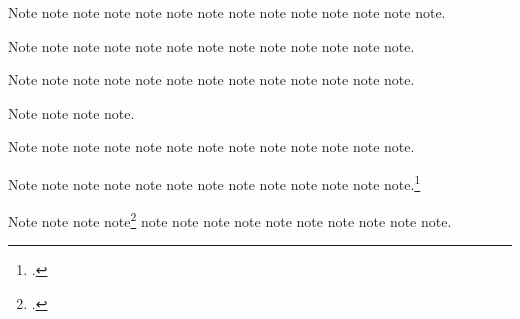 \documentclass[a4paper,12pt]{report}
\begin{document}
Note\autocite{ac:comment} note\autocite{adorno:benj}
note\autocite{aristotle:metaphy:gr} note\autocite{adorno:benj}
note\autocite[23]{adorno:benj} note\autocite{ashbrook:brain}
note\autocite[3.2.996b5--8]{aristotle:metaphy:gr}
note\autocite{ac:comment} note\autocite{assocpress:gun}
note\autocite{auden:reading} note\autocite[149]{ashbrook:brain}
note\autocite{author:forthcoming} note\autocite{assocpress:gun}
note\autocite{babb:peru}.

Note\autocite{author:forthcoming} note\autocite{auden:reading}
note\autocite{barcott:review} note\autocite{batson}
note\autocite{babb:peru} note\autocite{barcott:review}
note\autocite[339]{batson} note\autocite{beattie:crime}
note\autocite{bedford:photo} note\autocite{babb:peru}
note\autocite{beethoven:sonata29} note\autocite{bernhard:boris}
note\autocite{bernhard:ritter}.

Note\autocite{bernstein:shostakovich} note\autocite{boxer:china}
note\autocite{beattie:crime}  note\autocite{brown:bremer}
note\autocite{beethoven:sonata29} note\autocite{bernhard:ritter}
note\autocite{bernstein:shostakovich} note\autocite{bernhard:boris}
note\autocite{boxer:china} note\autocite{browning:aurora}
note\autocite[pt.\ 2:55]{brown:bremer} note\autocite{bundy:macneil}
note\autocite{centinel:letters}.

Note\autocite{chaucer:liferecords} note\autocite{browning:aurora}
note\autocite[\printdate]{bundy:macneil}
note\autocite[29]{centinel:letters}.

Note\autocite{chaucer:alt} note\autocite{clark:mesopot}
note\autocite{chaucer:liferecords} note\autocite{cleese:holygrail}
note\autocite{Clemens:letter} note\autocite{cohen:schiff}
note\autocite{Clemens:letter} note\autocite{clark:mesopot}
note\autocite{cleese:holygrail} note\autocite{cohen:schiff}
note\autocite{chaucer:alt} note\autocite{conley:fifthgrade}
note\autocite{contrib:contrib}.

Note\autocite{conley:fifthgrade} note\autocite{contrib:contrib}
note\autocite{cook:sotweed} note\autocite{cotton:manufacture}
note\autocite{coolidge:speech} note\autocite{cook:sotweed}
note\autocite{creasey:ashe:blast} note\autocite{creasey:york:death}
note\autocite{cotton:manufacture} note\autocite{creasey:morton:hide}
note\autocite{coolidge:speech} note\autocite{creasey:ashe:blast}
note.\footnote{.}

Note\autocite{davenport:attention} note\autocite{creasey:york:death}
note\autocite{creasey:morton:hide}
note\footnote{.}
note\autocite{dinkel:agassiz} note\autocite{donne:var}
note\autocite{davenport:attention} note\autocite{dunn:revolutions}
note\autocite{dyna:browser} note\autocite{dinkel:agassiz}
note\autocite{eliot:pound} note\autocite{ellet:galena}
note\autocite{donne:var} note\autocite{dyna:browser}.
\end{document}
